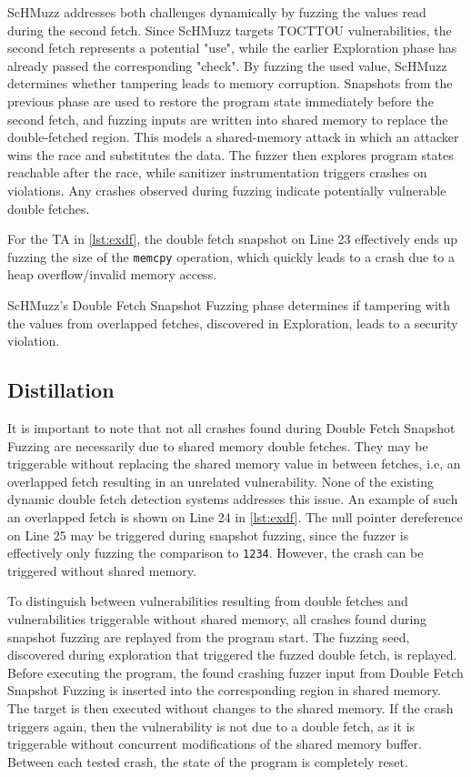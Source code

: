 \documentclass[conference]{IEEEtran}
\newcommand{\sysname}{ScHMuzz\xspace}
\newcommand{\stageone}{Exploration\xspace}
\newcommand{\stagetwo}{Double Fetch Snapshot Fuzzing\xspace}
\newcommand{\stagethree}{Distillation\xspace}
\begin{document}
\sysname addresses both challenges dynamically by fuzzing the values read during the second fetch. 
Since \sysname targets TOCTTOU vulnerabilities, the second fetch represents a potential "use", while the 
earlier \stageone phase has already passed the corresponding "check". By fuzzing the used value, 
\sysname determines whether tampering leads to memory corruption. Snapshots from the previous phase 
are used to restore the program state immediately before the second fetch, and fuzzing inputs are 
written into shared memory to replace the double-fetched region. This models a shared-memory attack 
in which an attacker wins the race and substitutes the data. The fuzzer then explores program states 
reachable after the race, while sanitizer instrumentation triggers crashes on violations. Any crashes 
observed during fuzzing indicate potentially vulnerable double fetches.

For the TA in \autoref{lst:exdf}, the double fetch snapshot on Line 23 
effectively ends up fuzzing the size of the \texttt{memcpy} operation, which 
quickly leads to a crash due to a heap overflow/invalid memory access.

\begin{tcolorbox}
    \sysname's \stagetwo phase determines if tampering with the values from overlapped fetches, discovered in \stageone, 
    leads to a security violation.
\end{tcolorbox}

\subsection{\stagethree}
It is important to note that not all crashes found during \stagetwo are necessarily 
due to shared memory double fetches. They may be triggerable without replacing the shared 
memory value in between fetches, i.e, an overlapped fetch resulting in an unrelated vulnerability. 
None of the existing dynamic double fetch detection systems addresses this issue.
An example of such an overlapped fetch is shown on Line 24 in \autoref{lst:exdf}. The null 
pointer dereference on Line 25 may be triggered during snapshot fuzzing, since the fuzzer 
is effectively only fuzzing the comparison to \texttt{1234}.
However, the crash can be triggered without shared memory.

To distinguish between vulnerabilities resulting from double fetches and vulnerabilities triggerable 
without shared memory, all crashes found during snapshot fuzzing are replayed from the 
program start. The fuzzing seed, discovered during exploration that triggered the fuzzed 
double fetch, is replayed. Before executing the program, the found crashing fuzzer input from 
\stagetwo is inserted into the corresponding region in shared memory. The target is then executed 
without changes to the shared memory.
If the crash triggers again, then the vulnerability is not due to a double fetch, as it is 
triggerable without concurrent modifications of the shared memory buffer. Between each tested crash, 
the state of the program is completely reset. 
\end{document}
